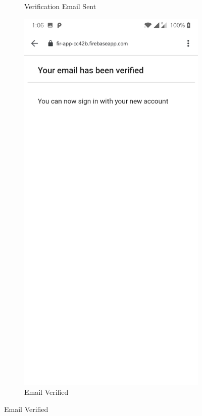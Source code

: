\documentclass[12pt, english]{article}
\begin{document}
\begin{figure}[h!]
\begin{subfigure}[t]{0.4\textwidth}
     \caption{Verification Email Sent}
    \end{subfigure}
    \begin{subfigure}[t]{0.4\textwidth}
    \includegraphics[width=\linewidth]{Account_Creation/email_verified_window.jpg}
        \caption{Email Verified}
    \end{subfigure}
    \label{fig:arp_os}
\end{figure}
\end{document}

